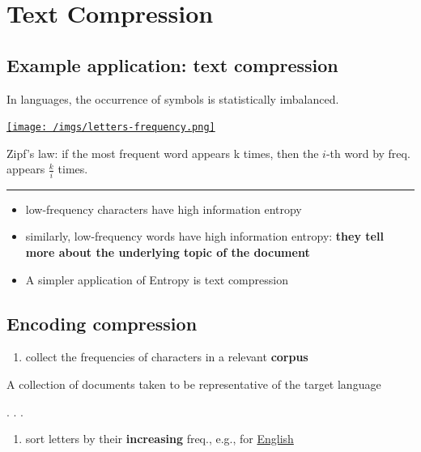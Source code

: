 \documentclass[
  letterpaper,
  DIV=11,
  numbers=noendperiod]{scrartcl}
\providecommand{\tightlist}{%
  \setlength{\itemsep}{0pt}\setlength{\parskip}{0pt}}\usepackage{longtable,booktabs,array}
\begin{document}
\section{Text Compression}\label{text-compression}

\subsection{Example application: text
compression}\label{example-application-text-compression}

In languages, the occurrence of symbols is statistically imbalanced.

\href{https://en.wikipedia.org/wiki/Letter_frequency}{\texttt{[image: /imgs/letters-frequency.png]}}

Zipf's law: if the most frequent word appears k times, then the \(i\)-th
word by freq. appears \(\frac{k}{i}\) times.

\begin{center}\rule{0.5\linewidth}{0.5pt}\end{center}

\begin{itemize}
\item
  low-frequency characters have high information entropy
\item
  similarly, low-frequency words have high information entropy:
  \textbf{they tell more about the underlying topic of the document}
\item
  A simpler application of Entropy is text compression
\end{itemize}

\subsection{Encoding compression}\label{encoding-compression}

\begin{enumerate}
\def\labelenumi{\arabic{enumi}.}
\tightlist
\item
  collect the frequencies of characters in a relevant \textbf{corpus}
\end{enumerate}

A collection of documents taken to be representative of the target
language

. . .

\begin{enumerate}
\def\labelenumi{\arabic{enumi}.}
\tightlist
\item
  sort letters by their \textbf{increasing} freq., e.g., for
  \href{https://en.wikipedia.org/wiki/Letter_frequency}{English}
\end{enumerate}
\end{document}
